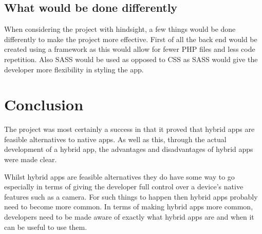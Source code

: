 \subsection{What would be done differently}
When considering the project with hindsight, a few things would be done differently to make the project more effective. First of all the back end would be created using a framework as this would allow for fewer PHP files and less code repetition. Also SASS would be used as opposed to CSS as SASS would give the developer more flexibility in styling the app.

\section{Conclusion}
The project was most certainly a success in that it proved that hybrid apps are feasible alternatives to native apps. As well as this, through the actual development of a hybrid app, the advantages and disadvantages of hybrid apps were made clear.

Whilst hybrid apps are feasible alternatives they do have some way to go especially in terms of giving the developer full control over a device's native features such as a camera. For such things to happen then hybrid apps probably need to become more common. In terms of making hybrid apps more common, developers need to be made aware of exactly what hybrid apps are and when it can be useful to use them. 

